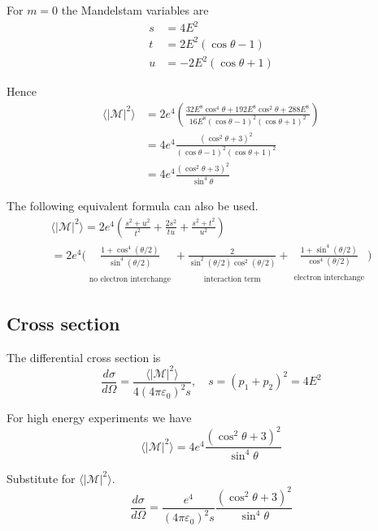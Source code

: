\documentclass[12pt]{article}
\begin{document}
For $m=0$ the Mandelstam variables are
\begin{align*}
s&=4E^2
\\
t&=2E^2(\cos\theta-1)
\\
u&=-2E^2(\cos\theta+1)
\end{align*}

Hence
\begin{align*}
\langle|\mathcal{M}|^2\rangle
&=2e^4
\left(
\frac{32E^8\cos^4\theta+192E^8\cos^2\theta+288E^8}{16E^8(\cos\theta-1)^2(\cos\theta+1)^2}
\right)
\\
&=4e^4\frac{\left(\cos^2\theta+3\right)^2}{(\cos\theta-1)^2(\cos\theta+1)^2}
\\
&=4e^4
\frac{(\cos^2\theta+3)^2}{\sin^4\theta}
\end{align*}

The following equivalent formula can also be used.
\begin{multline*}
\langle|\mathcal{M}|^2\rangle
=2e^4
\left(
\frac{s^2+u^2}{t^2}+\frac{2s^2}{tu}+\frac{s^2+t^2}{u^2}
\right)
\\
=2e^4\biggl(
\underset{\substack{\\[1ex]\text{no electron interchange}}}
{\frac{1+\cos^4(\theta/2)}{\sin^4(\theta/2)}}
+
\underset{\substack{\\[1ex]\text{interaction term}}}
{\frac{2}{\sin^2(\theta/2)\cos^2(\theta/2)}}
+
\underset{\substack{\\[1ex]\text{electron interchange}}}
{\frac{1+\sin^4(\theta/2)}{\cos^4(\theta/2)}}
\biggr)
\end{multline*}

\subsection*{Cross section}
The differential cross section is
\begin{equation*}
\frac{d\sigma}{d\Omega}=\frac{\langle|\mathcal{M}|^2\rangle}{4(4\pi\varepsilon_0)^2s},
\quad s=(p_1+p_2)^2=4E^2
\end{equation*}

For high energy experiments we have
\begin{equation*}
\langle|\mathcal{M}|^2\rangle=4e^4\frac{(\cos^2\theta+3)^2}{\sin^4\theta}
\end{equation*}

Substitute for $\langle|\mathcal{M}|^2\rangle$.
\begin{equation*}
\frac{d\sigma}{d\Omega}=\frac{e^4}{(4\pi\varepsilon_0)^2s}\frac{(\cos^2\theta+3)^2}{\sin^4\theta}
\end{equation*}
\end{document}
